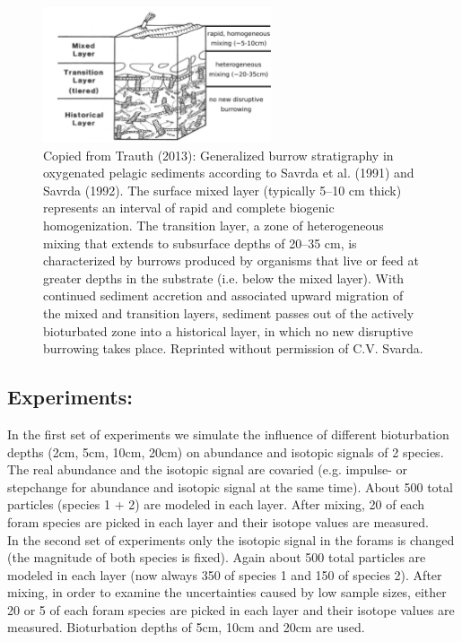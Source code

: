 \documentclass[a4paper,oneside,9pt]{article}
\begin{document}
\begin{figure}[hbp]
\begin{center}
	\includegraphics[width=0.6\textwidth]{../figures/Sediment_column.pdf}
	\caption{Copied from  Trauth (2013): Generalized burrow stratigraphy in oxygenated pelagic sediments according
to Savrda et al. (1991) and Savrda (1992). The surface mixed layer (typically 5--10 cm thick) represents an interval of rapid and complete biogenic homogenization.
The transition layer, a zone of heterogeneous mixing that extends to subsurface depths of 20--35 cm, is characterized by burrows produced by organisms that live or
feed at greater depths in the substrate (i.e. below the mixed layer). With continued sediment accretion and associated upward migration of the mixed and transition
layers, sediment passes out of the actively bioturbated zone into a historical layer, in which no new disruptive burrowing takes place. Reprinted without permission of C.V. Svarda.
}\label{fig:TURBO2_schematic}
\end{center}
\end{figure}

\subsection{Experiments:}
In the first set of experiments we simulate the influence of different bioturbation depths (2cm, 5cm, 10cm, 20cm) on abundance and isotopic signals of 2 species. The 
real abundance and the isotopic signal are covaried (e.g. impulse- or stepchange for abundance and isotopic signal at the same time). About 500 total particles (species 1 + 2) are modeled in each layer. 
After mixing, 20 of each foram species are picked in each layer and their isotope values are measured.\\

In the second set of experiments only the isotopic signal in the forams is changed (the magnitude of both species is fixed). Again about 500 total particles are modeled in each layer (now always 350 of species 1 and 150 of species 2). 
After mixing, in order to examine the uncertainties caused by low sample sizes, either 20 or 5 of each foram species are picked in each layer and their isotope values are measured.
Bioturbation depths of 5cm, 10cm and 20cm are used. \\
\end{document}
